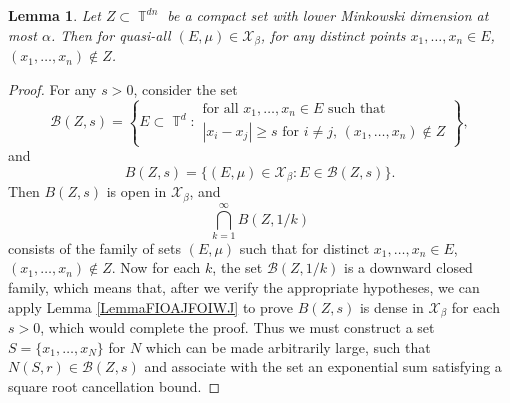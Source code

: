 \documentclass[dvipsnames,letterpaper,12pt]{article}
\numberwithin{equation}{section}
\DeclareMathOperator{\TT}{\mathbb{T}}
\newtheorem{lemma}[theorem]{Lemma}
\numberwithin{theorem}{section}
\begin{document}
\begin{lemma} \label{LemmaVIVIJCIJSIJ}
    Let $Z \subset \TT^{dn}$ be a compact set with lower Minkowski dimension at most $\alpha$. Then for quasi-all $(E,\mu) \in \mathcal{X}_\beta$, for any distinct points $x_1, \dots, x_n \in E$, $(x_1, \dots, x_n) \not \in Z$.
\end{lemma}
\begin{proof}
    For any $s > 0$, consider the set
    \[ \mathcal{B}(Z,s) = \left\{ E \subset \TT^d: \begin{array}{c}
            \text{for all $x_1, \dots, x_n \in E$ such that}\\
            \text{$|x_i - x_j| \geq s$ for $i \neq j$, $(x_1, \dots, x_n) \not \in Z$}
        \end{array} \right\}, \]
    and
    \[ B(Z,s) = \{ (E,\mu) \in \mathcal{X}_\beta: E \in \mathcal{B}(Z,s) \}. \]
    Then $B(Z,s)$ is open in $\mathcal{X}_\beta$, and
    \begin{equation}
        \bigcap_{k = 1}^\infty B(Z,1/k)
    \end{equation}
    consists of the family of sets $(E,\mu)$ such that for distinct $x_1, \dots, x_n \in E$, $(x_1, \dots, x_n) \not \in Z$. Now for each $k$, the set $\mathcal{B}(Z,1/k)$ is a downward closed family, which means that, after we verify the appropriate hypotheses, we can apply Lemma \ref{LemmaFIOAJFOIWJ} to prove $B(Z,s)$ is dense in $\mathcal{X}_\beta$ for each $s > 0$, which would complete the proof. Thus we must construct a set $S = \{ x_1, \dots, x_N \}$ for $N$ which can be made arbitrarily large, such that $N(S,r) \in \mathcal{B}(Z,s)$ and associate with the set an exponential sum satisfying a square root cancellation bound.


\end{proof}
\end{document}
